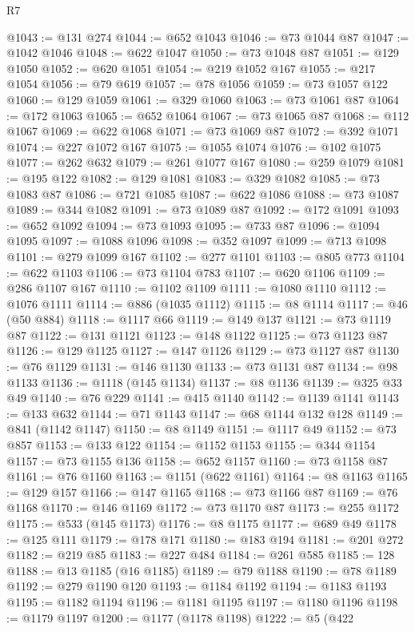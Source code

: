 \begin{lexlean}{R7}
\begin{coremodule}
@1043 := @131 @274
@1044 := @652 @1043
@1046 := @73 @1044 @87
@1047 := @1042 @1046
@1048 := @622 @1047
@1050 := @73 @1048 @87
@1051 := @129 @1050
@1052 := @620 @1051
@1054 := @219 @1052 @167
@1055 := @217 @1054
@1056 := @79 @619
@1057 := @78 @1056
@1059 := @73 @1057 @122
@1060 := @129 @1059
@1061 := @329 @1060
@1063 := @73 @1061 @87
@1064 := @172 @1063
@1065 := @652 @1064
@1067 := @73 @1065 @87
@1068 := @112 @1067
@1069 := @622 @1068
@1071 := @73 @1069 @87
@1072 := @392 @1071
@1074 := @227 @1072 @167
@1075 := @1055 @1074
@1076 := @102 @1075
@1077 := @262 @632
@1079 := @261 @1077 @167
@1080 := @259 @1079
@1081 := @195 @122
@1082 := @129 @1081
@1083 := @329 @1082
@1085 := @73 @1083 @87
@1086 := @721 @1085
@1087 := @622 @1086
@1088 := @73 @1087
@1089 := @344 @1082
@1091 := @73 @1089 @87
@1092 := @172 @1091
@1093 := @652 @1092
@1094 := @73 @1093
@1095 := @733 @87
@1096 := @1094 @1095
@1097 := @1088 @1096
@1098 := @352 @1097
@1099 := @713 @1098
@1101 := @279 @1099 @167
@1102 := @277 @1101
@1103 := @805 @773
@1104 := @622 @1103
@1106 := @73 @1104 @783
@1107 := @620 @1106
@1109 := @286 @1107 @167
@1110 := @1102 @1109
@1111 := @1080 @1110
@1112 := @1076 @1111
@1114 := @886 (@1035 @1112)
@1115 := @8 @1114
@1117 := @46 (@50 @884)
@1118 := @1117 @66
@1119 := @149 @137
@1121 := @73 @1119 @87
@1122 := @131 @1121
@1123 := @148 @1122
@1125 := @73 @1123 @87
@1126 := @129 @1125
@1127 := @147 @1126
@1129 := @73 @1127 @87
@1130 := @76 @1129
@1131 := @146 @1130
@1133 := @73 @1131 @87
@1134 := @98 @1133
@1136 := @1118 (@145 @1134)
@1137 := @8 @1136
@1139 := @325 @33 @49
@1140 := @76 @229
@1141 := @415 @1140
@1142 := @1139 @1141
@1143 := @133 @632
@1144 := @71 @1143
@1147 := @68 @1144 @132 @128
@1149 := @841 (@1142 @1147)
@1150 := @8 @1149
@1151 := @1117 @49
@1152 := @73 @857
@1153 := @133 @122
@1154 := @1152 @1153
@1155 := @344 @1154
@1157 := @73 @1155 @136
@1158 := @652 @1157
@1160 := @73 @1158 @87
@1161 := @76 @1160
@1163 := @1151 (@622 @1161)
@1164 := @8 @1163
@1165 := @129 @157
@1166 := @147 @1165
@1168 := @73 @1166 @87
@1169 := @76 @1168
@1170 := @146 @1169
@1172 := @73 @1170 @87
@1173 := @255 @1172
@1175 := @533 (@145 @1173)
@1176 := @8 @1175
@1177 := @689 @49
@1178 := @125 @111
@1179 := @178 @171
@1180 := @183 @194
@1181 := @201 @272
@1182 := @219 @85
@1183 := @227 @484
@1184 := @261 @585
@1185 := 128
@1188 := @13 @1185 (@16 @1185)
@1189 := @79 @1188
@1190 := @78 @1189
@1192 := @279 @1190 @120
@1193 := @1184 @1192
@1194 := @1183 @1193
@1195 := @1182 @1194
@1196 := @1181 @1195
@1197 := @1180 @1196
@1198 := @1179 @1197
@1200 := @1177 (@1178 @1198)
@1222 := @5
    (@422

\end{coremodule}
\end{lexlean}
